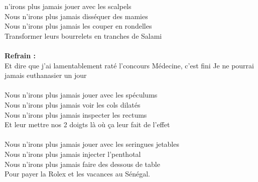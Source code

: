 
 n'irons plus jamais jouer avec les scalpels
\\Nous n'irons plus jamais disséquer des mamies
\\Nous n'irons plus jamais les couper en rondelles
\\Transformer leurs bourrelets en tranches de Salami
\\\\\textbf{Refrain :}
\\
{Et dire que j'ai lamentablement raté l'concours}
{Médecine, c'est fini}
{Je ne pourrai jamais euthanasier un jour}
\\\\Nous n'irons plus jamais jouer avec les spéculums
\\Nous n'irons plus jamais voir les cols dilatés
\\Nous n'irons plus jamais inspecter les rectums
\\Et leur mettre nos 2 doigts là où ça leur fait de l'effet
\\\\Nous n'irons plus jamais jouer avec les seringues jetables
\\Nous n'irons plus jamais injecter l'penthotal
\\Nous n'irons plus jamais faire des dessous de table
\\Pour payer la Rolex et les vacances au Sénégal.
\\
\breakpage
